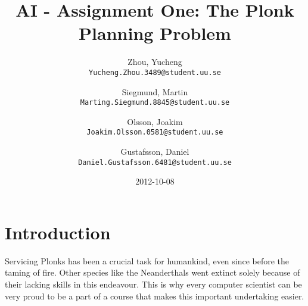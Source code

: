 \documentclass{article}
\begin{document}
\title{AI - Assignment One: The Plonk Planning Problem}
\date{2012-10-08}
\author{
	Zhou, Yucheng\\
	\texttt{Yucheng.Zhou.3489@student.uu.se}
	\and
	Siegmund, Martin\\
	\texttt{Marting.Siegmund.8845@student.uu.se}
	\and
	Olsson, Joakim\\
	\texttt{Joakim.Olsson.0581@student.uu.se}
	\and
	Gustafsson, Daniel\\
	\texttt{Daniel.Gustafsson.6481@student.uu.se}
}
\maketitle

\section*{Introduction}
 Servicing Plonks has been a crucial task for humankind, even since before the taming of fire. Other species like the Neanderthals went extinct solely because of their lacking skills in this endeavour. This is why every computer scientist can be very proud to be a part of a course that makes this important undertaking easier.
\end{document}
